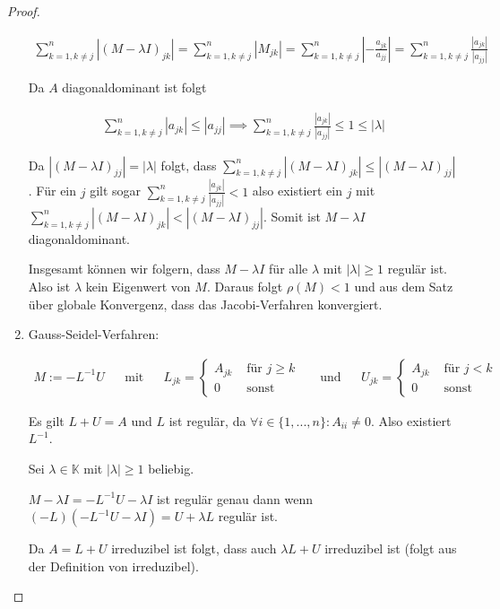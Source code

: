 \documentclass[]{article}
\begin{document}
\begin{proof}
\begin{enumerate}
		\begin{align*}
			\sum_{k=1,k\neq j}^{n}|(M-\lambda I)_{jk}| = \sum_{k=1,k\neq j}^{n}|M_{jk}| = \sum_{k=1,k\neq j}^{n}\left|-\frac{a_{jk}}{a_{jj}}\right| = \sum_{k=1,k\neq j}^{n} \frac{|a_{jk}|}{|a_{jj}|}
		\end{align*}
	
		Da $A$ diagonaldominant ist folgt 
		
		\begin{align*}
			\sum_{k=1,k\neq j}^{n}|a_{jk}| \leq |a_{jj}| \implies \sum_{k=1,k\neq j}^{n}\frac{|a_{jk}|}{|a_{jj}|} \leq 1 \leq |\lambda|
		\end{align*}
	
		Da $|(M-\lambda I)_{jj}| = |\lambda|$ folgt, dass $\sum_{k=1,k\neq j}^{n}|(M-\lambda I)_{jk}| \leq |(M-\lambda I)_{jj}|$. Für ein $j$ gilt sogar $\sum_{k=1,k\neq j}^{n}\frac{|a_{jk}|}{|a_{jj}|} < 1$ also existiert ein $j$ mit $\sum_{k=1,k\neq j}^{n}|(M-\lambda I)_{jk}| < |(M-\lambda I)_{jj}|$. Somit ist $M-\lambda I$ diagonaldominant.
		
		Insgesamt können wir folgern, dass $M-\lambda I$ für alle $\lambda$ mit $|\lambda|\geq 1$ regulär ist. Also ist $\lambda$ kein Eigenwert von $M$. Daraus folgt $\rho (M) < 1$ und aus dem Satz über globale Konvergenz, dass das Jacobi-Verfahren konvergiert.
		
		\item Gauss-Seidel-Verfahren:
		
		\begin{align*}
			M:=-L^{-1}U && \text{mit} && L_{jk}=\begin{cases}
				A_{jk} & \text{ für } j\geq k\\
				0 & \text{ sonst}
			\end{cases}
			&& \text{und} && U_{jk}=\begin{cases}
				A_{jk} & \text{ für } j < k\\
				0 & \text{ sonst}
			\end{cases}
		\end{align*}
	
	Es gilt $L+U=A$ und $L$ ist regulär, da $\forall i\in\{1,...,n\}:A_{ii}\neq 0$. Also existiert $L^{-1}$.
	
	Sei $\lambda\in\mathbb{K}$ mit $|\lambda|\geq 1$ beliebig.
	
	$M-\lambda I = -L^{-1}U-\lambda I$ ist regulär genau dann wenn $(-L)(-L^{-1}U-\lambda I) = U+\lambda L$ regulär ist.
	
	Da $A=L+U$ irreduzibel ist folgt, dass auch $\lambda L + U$ irreduzibel ist (folgt aus der Definition von irreduzibel).
	

\end{enumerate}
\end{proof}
\end{document}
